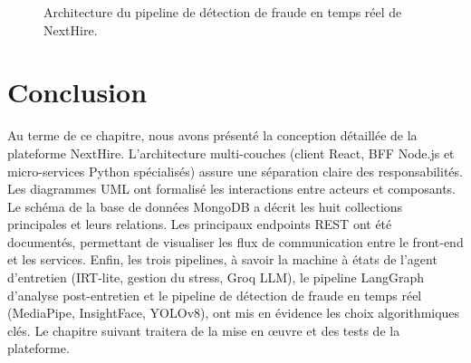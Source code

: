 \begin{figure}[H]
{%
  }%
  \caption{Architecture du pipeline de détection de fraude en temps réel de NextHire.}
  \label{fig:cheat-pipeline}
\end{figure}

\section{Conclusion}

Au terme de ce chapitre, nous avons présenté la conception détaillée de la plateforme
NextHire. L'architecture multi-couches (client React, BFF Node.js et micro-services
Python spécialisés) assure une séparation claire des responsabilités. Les diagrammes
UML ont formalisé les interactions entre acteurs et composants. Le schéma de la base de
données MongoDB a décrit les huit collections principales et leurs relations. Les
principaux endpoints REST ont été documentés, permettant de visualiser les flux de
communication entre le front-end et les services. Enfin, les trois pipelines, à savoir
la machine à états de l'agent d'entretien (IRT-lite, gestion du stress, Groq LLM), le
pipeline LangGraph d'analyse post-entretien et le pipeline de détection de fraude en
temps réel (MediaPipe, InsightFace, YOLOv8), ont mis en évidence les choix
algorithmiques clés. Le chapitre suivant traitera de la mise en œuvre et des tests
de la plateforme.
